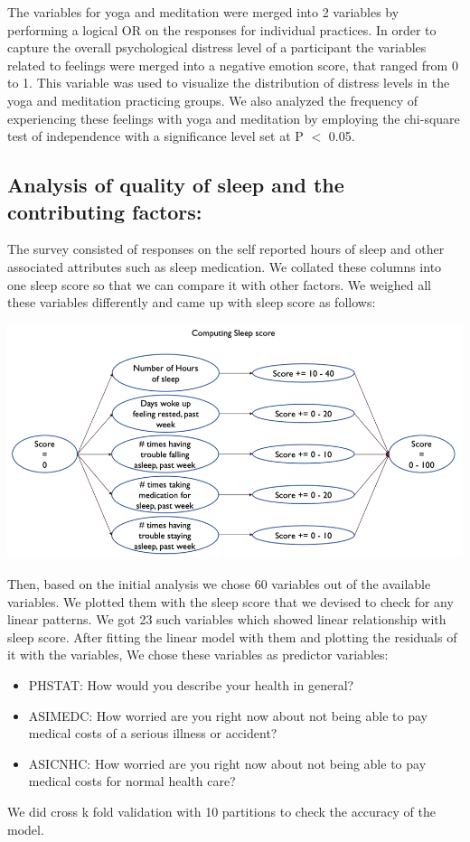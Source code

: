 \documentclass[12pt]{article}
\begin{document}
The variables for yoga and meditation were merged into 2 variables by performing a logical OR on the responses for individual practices. 
In order to capture the overall psychological distress level of a participant the variables related to feelings were merged into a negative emotion score, that ranged from 0 to 1.  This variable was used to visualize the distribution of distress levels in the yoga and meditation practicing groups.
We also analyzed the frequency of experiencing these feelings with yoga and meditation by employing the chi-square test of independence with a significance level set at P $<$ 0.05.


\subsection{Analysis of quality of sleep and the contributing factors:}
The survey consisted of responses on the self reported hours of sleep and other associated attributes such as sleep medication. We collated these columns into one sleep score so that we can compare it with other factors. We weighed all these variables differently and came up with sleep score as follows:

\includegraphics[scale = 0.75]{sleepscore.png} 

Then, based on the initial analysis we chose 60 variables out of the available variables. We plotted them with the sleep score that we devised to check for any linear patterns. We got 23 such variables which showed linear relationship with sleep score. 
After fitting the linear model with them and plotting the residuals of it with the variables, We chose these variables as predictor variables:\\
\begin{itemize}
    \item PHSTAT:     How would you describe your health in general?
    \item ASIMEDC: How worried are you right now about not being able to pay medical costs of a serious illness or accident?
    \item ASICNHC:  How worried are you right now about not being able to pay medical costs for normal health care?
    
\end{itemize}
We did cross k fold validation with 10 partitions to check the accuracy of the model.\\
\end{document}
